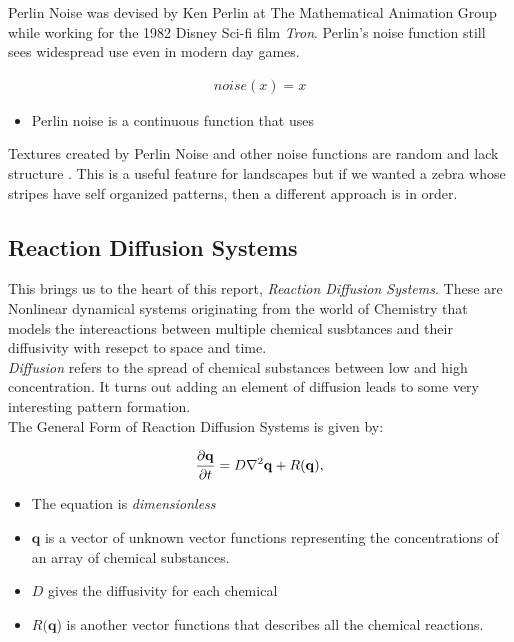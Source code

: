\documentclass[a4paper, 11pt]{article}
\begin{document}
Perlin Noise was devised by Ken Perlin at The Mathematical Animation Group while working for the 1982 Disney Sci-fi film \emph{Tron}. Perlin's noise function still sees widespread use even in modern day games.

\begin{align*}
	noise(x) = x
\end{align*}

\begin{itemize}
	\item Perlin noise is a continuous function that uses
\end{itemize}

Textures created by Perlin Noise and other noise functions are random and lack structure \cite{lagae2010}. This is a useful feature for landscapes but if we wanted a zebra whose stripes have self organized patterns, then a different approach is in order.


\subsection{Reaction Diffusion Systems}
\label{sec:rd-systems}


This brings us to the heart of this report, \emph{Reaction Diffusion Systems}. These are Nonlinear dynamical systems originating from the world of Chemistry that models the intereactions between multiple chemical susbtances and their diffusivity with resepct to space and time.
\\
\emph{Diffusion} refers to the spread of chemical substances between low and high concentration. It turns out adding an element of diffusion leads to some very interesting pattern formation.
\\
The General Form of Reaction Diffusion Systems is given by:

\begin{equation} \label{eq:rd-general}
	\frac{\partial \mathbf{q}}{\partial t} = D \nabla^2 \mathbf{q} + R(\mathbf{q}),
\end{equation}


\begin{itemize}
	\item The equation is \emph{dimensionless}
	\item $\mathbf{q}$ is a vector of unknown vector functions representing the concentrations of an array of chemical substances.
	\item $D$ gives the diffusivity for each chemical
	\item $R(\mathbf{q}$) is another vector functions that describes all the chemical reactions.
\end{itemize}
\end{document}
